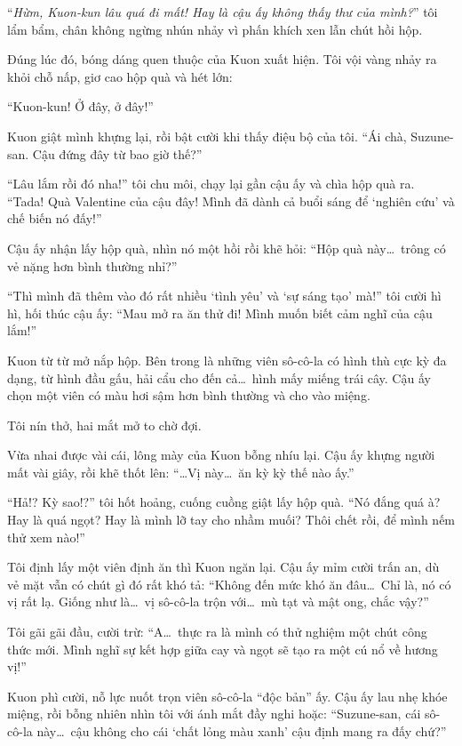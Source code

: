 \documentclass[../main.tex]{subfiles}
\begin{document}
``\textit{Hừm, Kuon-kun lâu quá đi mất! Hay là cậu ấy không thấy thư của mình?}'' tôi lẩm bẩm, chân không ngừng nhún nhảy vì phấn khích xen lẫn chút hồi hộp.

Đúng lúc đó, bóng dáng quen thuộc của Kuon xuất hiện. Tôi vội vàng nhảy ra khỏi chỗ nấp, giơ cao hộp quà và hét lớn:

``Kuon-kun! Ở đây, ở đây!''

Kuon giật mình khựng lại, rồi bật cười khi thấy điệu bộ của tôi. ``Ái chà, Suzune-san. Cậu đứng đây từ bao giờ thế?''

``Lâu lắm rồi đó nha!'' tôi chu môi, chạy lại gần cậu ấy và chìa hộp quà ra. ``Tada! Quà Valentine của cậu đây! Mình đã dành cả buổi sáng để `nghiên cứu' và chế biến nó đấy!''

Cậu ấy nhận lấy hộp quà, nhìn nó một hồi rồi khẽ hỏi: ``Hộp quà này\dots\ trông có vẻ nặng hơn bình thường nhỉ?''

``Thì mình đã thêm vào đó rất nhiều `tình yêu' và `sự sáng tạo' mà!'' tôi cười hì hì, hối thúc cậu ấy: ``Mau mở ra ăn thử đi! Mình muốn biết cảm nghĩ của cậu lắm!''

Kuon từ từ mở nắp hộp. Bên trong là những viên sô-cô-la có hình thù cực kỳ đa dạng, từ hình đầu gấu, hải cẩu cho đến cả\dots\ hình mấy miếng trái cây. Cậu ấy chọn một viên có màu hơi sậm hơn bình thường và cho vào miệng.

Tôi nín thở, hai mắt mở to chờ đợi.

Vừa nhai được vài cái, lông mày của Kuon bỗng nhíu lại. Cậu ấy khựng người mất vài giây, rồi khẽ thốt lên: ``\dots Vị này\dots\ ăn kỳ kỳ thế nào ấy.''

``Hả!? Kỳ sao!?'' tôi hốt hoảng, cuống cuồng giật lấy hộp quà. ``Nó đắng quá à? Hay là quá ngọt? Hay là mình lỡ tay cho nhầm muối? Thôi chết rồi, để mình nếm thử xem nào!''

Tôi định lấy một viên định ăn thì Kuon ngăn lại. Cậu ấy mỉm cười trấn an, dù vẻ mặt vẫn có chút gì đó rất khó tả: ``Không đến mức khó ăn đâu\dots\ Chỉ là, nó có vị rất lạ. Giống như là\dots\ vị sô-cô-la trộn với\dots\ mù tạt và mật ong, chắc vậy?''

Tôi gãi gãi đầu, cười trừ: ``A\dots\ thực ra là mình có thử nghiệm một chút công thức mới. Mình nghĩ sự kết hợp giữa cay và ngọt sẽ tạo ra một cú nổ về hương vị!''

Kuon phì cười, nỗ lực nuốt trọn viên sô-cô-la ``độc bản'' ấy. Cậu ấy lau nhẹ khóe miệng, rồi bỗng nhiên nhìn tôi với ánh mắt đầy nghi hoặc: ``Suzune-san, cái sô-cô-la này\dots\ cậu không cho cái `chất lỏng màu xanh' cậu định mang ra đấy chứ?''
\end{document}
